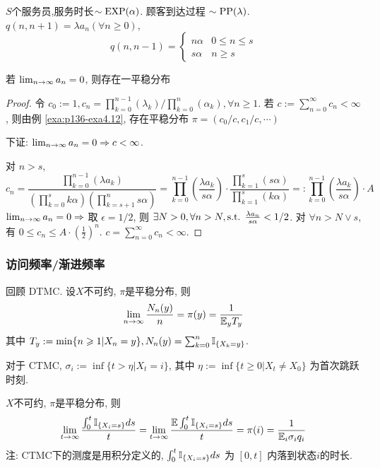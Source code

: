 \begin{example}
    $S$个服务员,服务时长$\sim \operatorname{EXP}(\alpha)$. 顾客到达过程 $\sim\operatorname{PP}(\lambda)$. $q(n,n+1)=\lambda a_n(\forall n\geq 0)$, 
    \[
    q(n,n-1)=\begin{cases}
        n\alpha & 0\leq n\leq s\\
        s\alpha & n\geq s
    \end{cases}
    \]
\end{example}

\begin{theorem}
    若 $\lim_{n \to \infty}a_n=0$, 则存在一平稳分布
\end{theorem}

\begin{proof}
    令 $c_0:=1, c_n=\prod_{k=0}^{n-1}(\lambda_k)/\prod_{k=0}^n(\alpha_k), \forall n\geq 1$. 若 $c:=\sum_{n=0}^{\infty}c_n<\infty$, 则由例 \ref{exa:p136-exa4.12}, 存在平稳分布 $\pi=(c_0/c,c_1/c,\cdots)$

    下证: $\lim_{n \to \infty}a_n=0\Rightarrow c<\infty$.

    对 $n>s$,
    \[
    c_n=\frac{\prod_{k=0}^{n-1}(\lambda a_k)}{(\prod_{k=0}^s k\alpha)(\prod_{k=s+1}^n s\alpha)}=\prod_{k=0}^{n-1}(\frac{\lambda a_k}{s\alpha})\cdot \frac{\prod_{k=1}^s(s\alpha)}{\prod_{k=1}^s (k\alpha)}=:\prod_{k=0}^{n-1}(\frac{\lambda a_k}{s\alpha})\cdot A
    \]
    $\lim_{n \to \infty}a_n=0 \Rightarrow $ 取 $\epsilon=1/2$, 则 $\exists N>0,\forall n>N,\text{s.t. } \frac{\lambda a_n}{s\alpha}<1/2$. 对 $\forall n>N\lor s$, 有 $0\leq c_n\leq A\cdot (\frac{1}{2})^n$. $c=\sum_{n=0}^{\infty}c_n<\infty$.
\end{proof}

\subsubsection{访问频率/渐进频率}

回顾 DTMC. 设$X$不可约, $\pi$是平稳分布, 则
\[
\lim_{n \to \infty}\frac{N_n(y)}{n}=\pi(y)=\frac{1}{\mathbb E_y T_y}
\]
其中 $T_y:=\min\{n\geqslant 1|X_n=y\}, N_n(y)=\sum_{k=0}^n\mathbb I_{\{X_k=y\}}$.

对于 CTMC, $\sigma_i:=\inf\{t>\eta|X_t=i\}$, 其中 $\eta:=\inf\{t\geq 0|X_t\neq X_0\}$ 为首次跳跃时刻.

\begin{theorem}[访问频率]
    $X$不可约, $\pi$是平稳分布, 则
    \[
    \lim_{t \to \infty}\frac{\int_0^t \mathbb I_{\{X_i=s\}}ds}{t}=\lim_{t \to \infty}\frac{\mathbb E \int_0^t \mathbb I_{\{X_i=s\}}ds}{t}=\pi(i)=\frac{1}{\mathbb E_i \sigma_i q_i}
    \]
    注: CTMC下的测度是用积分定义的, $\int_0^t\mathbb I_{\{X_i=s\}}ds$ 为 $[0,t]$ 内落到状态$i$的时长.
\end{theorem}

